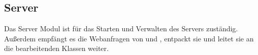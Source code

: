 \subsection{Server} \label{service:modul:Server}
Das Server Modul ist für das Starten und Verwalten des Servers zuständig. Außerdem empfängt es die Webanfragen von  und , entpackt sie und leitet sie an die bearbeitenden Klassen weiter.